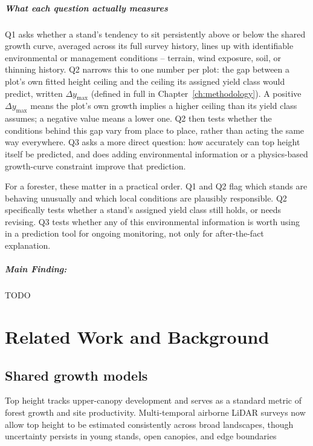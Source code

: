 \documentclass[logo,msc,ai]{infthesis}           %
\begin{document}
\paragraph*{What each question actually measures}
Q1 asks whether a stand's tendency to sit persistently above or below the shared growth curve, averaged across its full survey history, lines up with identifiable environmental or management conditions -- terrain, wind exposure, soil, or thinning history. Q2 narrows this to one number per plot: the gap between a plot's own fitted height ceiling and the ceiling its assigned yield class would predict, written $\Delta y_{\max}$ (defined in full in Chapter~\ref{ch:methodology}). A positive $\Delta y_{\max}$ means the plot's own growth implies a higher ceiling than its yield class assumes; a negative value means a lower one. Q2 then tests whether the conditions behind this gap vary from place to place, rather than acting the same way everywhere. Q3 asks a more direct question: how accurately can top height itself be predicted, and does adding environmental information or a physics-based growth-curve constraint improve that prediction.

For a forester, these matter in a practical order. Q1 and Q2 flag which stands are behaving unusually and which local conditions are plausibly responsible. Q2 specifically tests whether a stand's assigned yield class still holds, or needs revising. Q3 tests whether any of this environmental information is worth using in a prediction tool for ongoing monitoring, not only for after-the-fact explanation.

\paragraph*{Main Finding:}
TODO
\chapter{Related Work and Background}

\section*{Shared growth models}
Top height tracks upper-canopy development and serves as a standard metric of forest growth and site productivity. Multi-temporal airborne LiDAR surveys now allow top height to be estimated consistently across broad landscapes, though uncertainty persists in young stands, open canopies, and edge boundaries \cite{ForestResearch2026Sitka_C1_SS, suarezminguez2008Practical_C1_SS}
\end{document}
